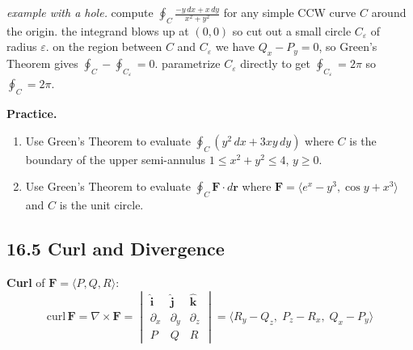 \documentclass[12pt]{article}
\theoremstyle{compact}
\renewcommand{\vec}[1]{\mathbf{#1}}
\newcommand{\vv}[1]{\langle #1 \rangle}
\newcommand{\grad}{\nabla}
\newcommand{\ihat}{\hat{\mathbf{i}}}
\newcommand{\jhat}{\hat{\mathbf{j}}}
\newcommand{\khat}{\hat{\mathbf{k}}}
\begin{document}
\begin{center}
\end{center}

\textit{example with a hole.} compute $\oint_C \tfrac{-y\,dx+x\,dy}{x^2+y^2}$ for any simple CCW curve $C$ around the origin. the integrand blows up at $(0,0)$ so cut out a small circle $C_\varepsilon$ of radius $\varepsilon$. on the region between $C$ and $C_\varepsilon$ we have $Q_x-P_y=0$, so Green's Theorem gives $\oint_C-\oint_{C_\varepsilon}=0$. parametrize $C_\varepsilon$ directly to get $\oint_{C_\varepsilon}=2\pi$ so $\oint_C=2\pi$.

\medskip\textbf{Practice.}
\begin{enumerate}[noitemsep]
  \item Use Green's Theorem to evaluate $\oint_C(y^2\,dx+3xy\,dy)$ where $C$ is the boundary of the upper semi-annulus $1\le x^2+y^2\le4$, $y\ge0$.
  \item Use Green's Theorem to evaluate $\oint_C\vec{F}\cdot d\vec{r}$ where $\vec{F}=\langle e^x-y^3,\cos y+x^3\rangle$ and $C$ is the unit circle.
\end{enumerate}

\subsection{16.5 Curl and Divergence}

\textbf{Curl} of $\vec{F}=\vv{P,Q,R}$:
\[
\text{curl}\,\vec{F} = \grad\times\vec{F} = \begin{vmatrix}\ihat&\jhat&\khat\\\partial_x&\partial_y&\partial_z\\P&Q&R\end{vmatrix} = \vv{R_y-Q_z,\;P_z-R_x,\;Q_x-P_y}
\]
\end{document}
